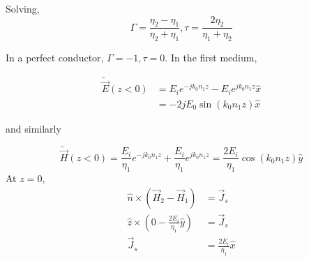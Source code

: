 \documentclass[12pt]{article}
\begin{document}
Solving,
$$\Gamma = \frac{\eta_2-\eta_1}{\eta_2+\eta_1}, \tau = \frac{2\eta_2}{\eta_1 + \eta_2}$$

In a perfect conductor, $\Gamma = -1, \tau = 0$. In the first medium,

\begin{align*}
    \tilde{\vec E}(z < 0) &= E_ie^{-jk_0n_1z} - E_ie^{jk_0n_1z} \hat x \\
                          &= -2jE_0\sin(k_0n_1z) \hat x
\end{align*}

and similarly

$$\tilde{\vec H}(z < 0) = \frac{E_i}{\eta_1} e^{-jk_0n_1z} + \frac{E_i}{\eta_1} e^{jk_0n_1z} = \frac{2E_i}{\eta_1}\cos(k_0n_1z) \hat y$$
At $z = 0$,
\begin{align*}
    \hat n \times (\vec H_2 - \vec H_1) &= \vec J_s \\
    \hat z \times \left(0 - \frac{2E_i}{\eta_1} \hat y\right) &= \vec J_s \\
    \vec J_s &= \frac{2E_i}{\eta_1} \hat x
\end{align*}
\end{document}
